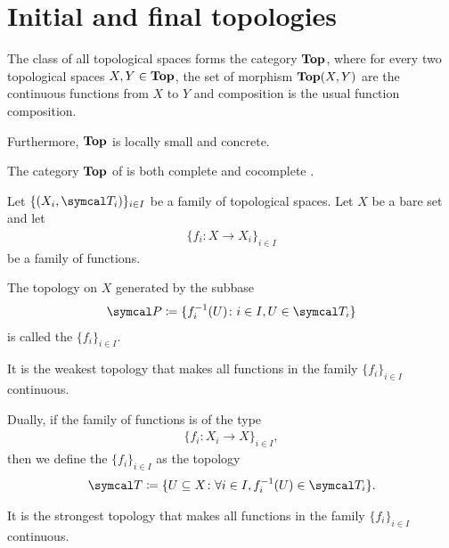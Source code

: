 \section{Initial and final topologies}\label{sec:initial_final_topologies}

\begin{definition}\label{def:category_of_topological_spaces}
  The class of all topological spaces forms the category $\operatorname{\mathbf{Top}}$, where for every two topological spaces $X, Y \in \operatorname{\mathbf{Top}}$, the set of morphism $\operatorname{\mathbf{Top}}(X, Y)$ are the continuous functions from $X$ to $Y$ and composition is the usual function composition.

  Furthermore, $\operatorname{\mathbf{Top}}$ is locally small and concrete.
\end{definition}

\begin{theorem}\label{thm:top_complete_cocomplete}
  The category $\operatorname{\mathbf{Top}}$ of is both complete  and cocomplete .
\end{theorem}

\begin{definition}\label{def:initial_topology}\cite{nLab:top}
  Let $\{ (X_i, \Cal{T}_i) \}_{i \in I}$ be a family of topological spaces. Let $X$ be a bare set and let
  \begin{align*}
    \{ f_i: X \to X_i \}_{i \in I}
  \end{align*}
  be a family of functions.

  The topology on $X$ generated by the subbase
  \begin{align*}
    \Cal{P} \coloneqq \{ f_i^{-1}(U) \colon i \in I, U \in \Cal{T}_i \}
  \end{align*}
  is called the  $\{ f_i \}_{i \in I}$.

  It is the weakest topology that makes all functions in the family $\{ f_i \}_{i \in I}$ continuous.
\end{definition}

\begin{definition}\label{def:final_topology}\cite{nLab:top}
  Dually, if the family of functions is of the type
  \begin{align*}
    \{ f_i: X_i \to X \}_{i \in I},
  \end{align*}
  then we define the  $\{ f_i \}_{i \in I}$ as the topology
  \begin{align*}
    \Cal{T} \coloneqq \{ U \subseteq X \colon \forall i \in I, f_i^{-1}(U) \in \Cal{T}_i \}.
  \end{align*}

  It is the strongest topology that makes all functions in the family $\{ f_i \}_{i \in I}$ continuous.
\end{definition}

